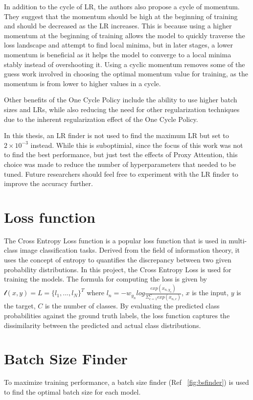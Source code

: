 In addition to the cycle of LR, the authors also propose a cycle of momentum. They suggest that the momentum should be high at the beginning of training and should be decreased as the LR increases. This is because using a higher momentum at the beginning of training allows the model to quickly traverse the loss landscape and attempt to find local minima, but in later stages, a lower momentum is beneficial as it helps the model to converge to a local minima stably instead of overshooting it. Using a cyclic momentum removes some of the guess work involved in choosing the optimal momentum value for training, as the momentum is from lower to higher values in a cycle. 

Other benefits of the One Cycle Policy include the ability to use higher batch sizes and LRs, while also reducing the need for other regularization techniques due to the inherent regularization effect of the One Cycle Policy.

In this thesis, an LR finder is not used to find the maximum LR but set to $2\times 10^{-3}$ instead. While this is suboptimial, since the focus of this work was not to find the best performance, but just test the effects of Proxy Attention, this choice was made to reduce the number of hyperparameters that needed to be tuned. Future researchers should feel free to experiment with the LR finder to improve the accuracy further.

\section{Loss function}
The Cross Entropy Loss function is a popular loss function that is used in multi-class image classification tasks. Derived from the field of information theory, it uses the concept of entropy to quantifies the discrepancy between two given probability distributions. In this project, the Cross Entropy Loss is used for training the models. The formula for computing the loss is given by $\mathscr{l}(x,y) = L = \{l_{1}, ..., l_{N}\}^{T}$ where $l_{n} = -w_{y_{n}}log \frac{exp(x_{n, y_{n}})}{\Sigma_{c=1}^{C}exp(x_{n,c})}$, $x$ is the input, $y$ is the target, $C$ is the number of classes. By evaluating the predicted class probabilities against the ground truth labels, the loss function captures the dissimilarity between the predicted and actual class distributions. 

\section{Batch Size Finder}
To maximize training performance, a batch size finder (Ref ~\ref{fig:bsfinder}) is used to find the optimal batch size for each model.

